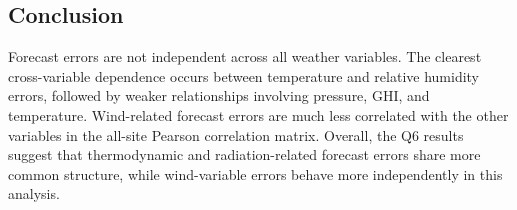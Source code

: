 \subsection{Conclusion}

Forecast errors are not independent across all weather variables. The clearest cross-variable dependence occurs between temperature and relative humidity errors, followed by weaker relationships involving pressure, GHI, and temperature. Wind-related forecast errors are much less correlated with the other variables in the all-site Pearson correlation matrix. Overall, the Q6 results suggest that thermodynamic and radiation-related forecast errors share more common structure, while wind-variable errors behave more independently in this analysis.
